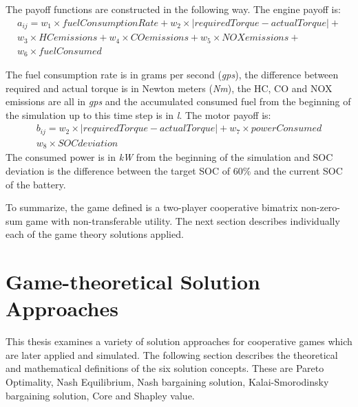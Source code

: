{The payoff functions are constructed in the following way. The engine payoff is:
\begin{equation}
\label{eq:payoffEngine}
\begin{split}
a_{ij} = w_1 \times fuelConsumptionRate + w_2 \times | requiredTorque - actualTorque | + \\
w_3 \times HCemissions + w_4 \times COemissions + w_5 \times NOXemissions + \\
w_6 \times fuelConsumed
\end{split}
\end{equation}

The fuel consumption rate is in grams per second (\textit{gps}), the difference between required and actual torque is in Newton meters (\textit{Nm}), the HC, CO and NOX emissions are all in \textit{gps} and the accumulated consumed fuel from the beginning of the simulation up to this time step is in \textit{l}. The motor payoff is:
\begin{equation}
\label{eq:payoffMotor}
\begin{split}
b_{ij} = w_2 \times | requiredTorque - actualTorque | + w_7 \times powerConsumed\\
w_8 \times SOCdeviation
\end{split}
\end{equation}
The consumed power is in \textit{kW} from the beginning of the simulation and SOC deviation is the difference between the target SOC of 60\% and the current SOC of the battery.

To summarize, the game defined is a two-player cooperative bimatrix non-zero-sum game with non-transferable utility. The next section describes individually each of the game theory solutions applied.

\section{Game-theoretical Solution Approaches}
This thesis examines a variety of solution approaches for cooperative games which are later applied and simulated. The following section describes the theoretical and mathematical definitions of the six solution concepts. These are Pareto Optimality, Nash Equilibrium, Nash bargaining solution, Kalai-Smorodinsky bargaining solution, Core and Shapley value.

}
